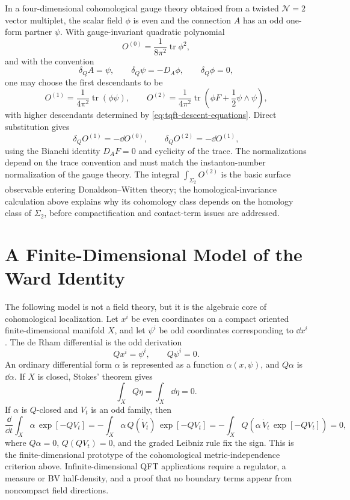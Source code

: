 \begin{example}
\label{ex:donaldson-descent-form}
In a four-dimensional cohomological gauge theory obtained from a twisted
\(\mathcal N=2\) vector multiplet, the scalar field \(\phi\) is even and the
connection \(A\) has an odd one-form partner \(\psi\).  With gauge-invariant
quadratic polynomial
\[
  O^{(0)}=\frac{1}{8\pi^2}\operatorname{tr}\phi^2,
\]
and with the convention
\[
  \delta_QA=\psi,\qquad
  \delta_Q\psi=-D_A\phi,\qquad
  \delta_Q\phi=0,
\]
one may choose the first descendants to be
\[
  O^{(1)}=\frac{1}{4\pi^2}\operatorname{tr}(\phi\psi),
  \qquad
  O^{(2)}=\frac{1}{4\pi^2}\operatorname{tr}
  \left(\phi F+\frac12\psi\wedge\psi\right),
\]
with higher descendants determined by
\eqref{eq:tqft-descent-equations}.  Direct substitution gives
\[
  \delta_QO^{(1)}=-\dd O^{(0)},
  \qquad
  \delta_QO^{(2)}=-\dd O^{(1)},
\]
using the Bianchi identity \(D_AF=0\) and cyclicity of the trace.  The
normalizations depend on the trace convention and must match the
instanton-number normalization of the gauge theory.  The integral
\(\int_{\Sigma_2}O^{(2)}\) is the basic surface observable entering
Donaldson--Witten theory;
the homological-invariance calculation above explains why its cohomology class
depends on the homology class of \(\Sigma_2\), before compactification and
contact-term issues are addressed.
\end{example}

\section{A Finite-Dimensional Model of the Ward Identity}

The following model is not a field theory, but it is the algebraic core of
cohomological localization.  Let \(x^i\) be even coordinates on a compact
oriented finite-dimensional manifold \(X\), and let \(\psi^i\) be odd
coordinates corresponding to \(\dd x^i\).  The de Rham differential is the
odd derivation
\[
  Qx^i=\psi^i,\qquad Q\psi^i=0.
\]
An ordinary differential form \(\alpha\) is represented as a function
\(\alpha(x,\psi)\), and \(Q\alpha\) is \(\dd\alpha\).  If \(X\) is closed,
Stokes' theorem gives
\[
  \int_X Q\eta=\int_X\dd\eta=0.
\]
If \(\alpha\) is \(Q\)-closed and \(V_t\) is an odd family, then
\[
  \frac{\dd}{\dd t}
  \int_X \alpha\,\exp[-Q V_t]
  =
  -\int_X \alpha\,Q(\dot V_t)\,\exp[-QV_t]
  =
  -\int_X Q\left(\alpha\,\dot V_t\,\exp[-QV_t]\right)=0,
\]
where \(Q\alpha=0\), \(Q(QV_t)=0\), and the graded Leibniz rule fix the
sign.  This is the finite-dimensional prototype of
the cohomological metric-independence criterion above.  Infinite-dimensional
QFT applications require a regulator, a measure or BV half-density, and a
proof that no boundary terms appear from noncompact field directions.

